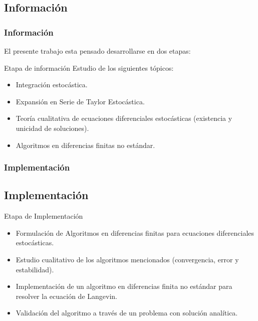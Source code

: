   \begin{frame}
  \subsection{Informaci\'on}
    \frametitle{Información}
    El presente trabajo esta pensado desarrollarse en dos etapas:
  \begin{block}{Etapa de información}
    Estudio de los siguientes tópicos:
    \begin{itemize}
      \item
        Integración  estocástica.
      \item
        Expansi\'on en Serie de Taylor Estoc\'astica.
      \item
        Teor\'ia cualitativa de ecuaciones diferenciales estoc\'asticas
      (existencia y unicidad de soluciones).
      \item
      Algoritmos en diferencias finitas no est\'andar.
  \end{itemize}
  \end{block}
 \end{frame}
\begin{frame}
   \frametitle{Implementación}
  \subsection{Implementación}
  \begin{block}{Etapa de Implementación}
      \begin{itemize}
        \item
          Formulaci\'on de Algoritmos en diferencias finitas para ecuaciones
          diferenciales estoc\'asticas.
        \item
          Estudio cualitativo de los algoritmos mencionados (convergencia, error y estabilidad).
        \item
          Implementaci\'on  de un algoritmo en diferencias finita no est\'andar para resolver la
          ecuaci\'on de Langevin.
        \item
          Validaci\'on del algoritmo a través de un problema con soluci\'on analítica.
      \end{itemize}
  \end{block}
\end{frame}

